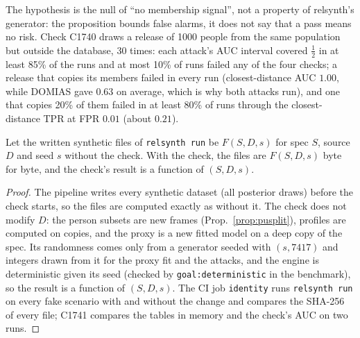 \noindent The hypothesis is the null of ``no membership signal'', not a property of relsynth's generator: the
proposition bounds false alarms, it does not say that a pass means no risk. Check C1740 draws a release of 1000 people
from the same population but outside the database, 30 times: each attack's AUC interval covered $\tfrac12$ in at least
85\% of the runs and at most 10\% of runs failed any of the four checks; a release that copies its members failed in
every run (closest-distance AUC $1.00$, while DOMIAS gave $0.63$ on average, which is why both attacks run), and one that copies 20\%
of them failed in at least 80\% of runs through the closest-distance TPR at FPR $0.01$ (about $0.21$).

\begin{proposition}\label{prop:qcident}
Let the written synthetic files of \texttt{relsynth run} be $F(S,D,s)$ for spec $S$, source $D$ and seed $s$ without the
check. With the check, the files are $F(S,D,s)$ byte for byte, and the check's result is a function of $(S,D,s)$.
\end{proposition}
\begin{proof}
The pipeline writes every synthetic dataset (all posterior draws) before the check starts, so the files are computed
exactly as without it. The check does not modify $D$: the person subsets are new frames
(Prop.~\ref{prop:pusplit}), profiles are computed on copies, and the proxy is a new fitted model on a deep copy of
the spec. Its randomness comes only from a generator seeded with $(s,7417)$ and integers drawn from it for the proxy
fit and the attacks, and the engine is deterministic given its seed (checked by \texttt{goal:deterministic} in the
benchmark), so the result is a function of $(S,D,s)$. The CI job \texttt{identity} runs \texttt{relsynth run} on every
fake scenario with and without the change and compares the SHA-256 of every file; C1741 compares the tables in memory
and the check's AUC on two runs.
\end{proof}
\setcounter{proposition}{\value{savedpropqc}}
